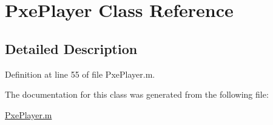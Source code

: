 \hypertarget{class_pxe_player}{\section{Pxe\-Player Class Reference}
\label{class_pxe_player}
}


\subsection{Detailed Description}


Definition at line 55 of file Pxe\-Player.\-m.



The documentation for this class was generated from the following file\-:\begin{DoxyCompactItemize}
\item 
\hyperlink{_pxe_player_8m}{Pxe\-Player.\-m}\end{DoxyCompactItemize}
